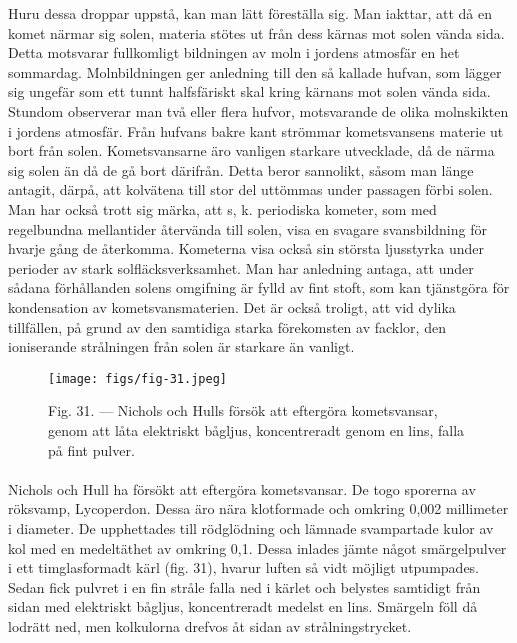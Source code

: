 \documentclass[a4paper, 12pt, oneside, swedish]{article}
\begin{document}
Huru dessa droppar uppstå, kan man lätt föreställa sig. Man iakttar, att då en komet närmar sig solen, materia stötes ut från dess kärnas mot solen vända sida. Detta motsvarar fullkomligt bildningen av moln i jordens atmosfär en het sommardag. Molnbildningen ger anledning till den så kallade hufvan, som lägger sig ungefär som ett tunnt halfsfäriskt skal kring kärnans mot solen vända sida. Stundom observerar man två eller flera hufvor, motsvarande de olika molnskikten i jordens atmosfär. Från hufvans bakre kant strömmar kometsvansens materie ut bort från solen. Kometsvansarne äro vanligen starkare utvecklade, då de närma sig solen än då de gå bort därifrån. Detta beror sannolikt, såsom man länge antagit, därpå, att kolvätena till stor del uttömmas under passagen förbi solen. Man har också trott sig märka, att s, k. periodiska kometer, som med regelbundna mellantider återvända till solen, visa en svagare svansbildning för hvarje gång de återkomma. Kometerna visa också sin största ljusstyrka under perioder av stark solfläcksverksamhet. Man har anledning antaga, att under sådana förhållanden solens omgifning är fylld av fint stoft, som kan tjänstgöra för kondensation av kometsvansmaterien. Det är också troligt, att vid dylika tillfällen, på grund av den samtidiga starka förekomsten av facklor, den ioniserande strålningen från solen är starkare än vanligt.

\begin{figure}[H]
\centering
\texttt{[image: figs/fig-31.jpeg]}
\caption{Fig. 31. --- Nichols och Hulls försök att eftergöra kometsvansar, genom att låta elektriskt bågljus, koncentreradt genom en lins, falla på fint pulver.}
\end{figure}
\paragraph{}
Nichols och Hull ha försökt att eftergöra kometsvansar. De togo sporerna av röksvamp, Lycoperdon. Dessa äro nära klotformade och omkring 0,002 millimeter i diameter. De upphettades till rödglödning och lämnade svampartade kulor av kol med en medeltäthet av omkring 0,1. Dessa inlades jämte något smärgelpulver i ett timglasformadt kärl (fig. 31), hvarur luften så vidt möjligt utpumpades. Sedan fick pulvret i en fin stråle falla ned i kärlet och belystes samtidigt från sidan med elektriskt bågljus, koncentreradt medelst en lins. Smärgeln föll då lodrätt ned, men kolkulorna drefvos åt sidan av strålningstrycket.
\end{document}
